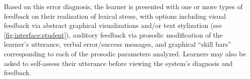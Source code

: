 \documentclass[a4paper]{article}
\begin{document}
 Based on this error diagnosis, the learner is presented with one or more types of feedback on their realization of lexical stress, with options including visual feedback via abstract graphical visualizations and/or text stylization (see \cref{fig:interface:student}), auditory feedback via prosodic modification of the learner's utterance, verbal error/success messages, and graphical ``skill bars'' corresponding to each of the prosodic parameters analyzed.  Learners may also be asked to self-assess their utterance before viewing the system's diagnosis and feedback.
\end{document}
